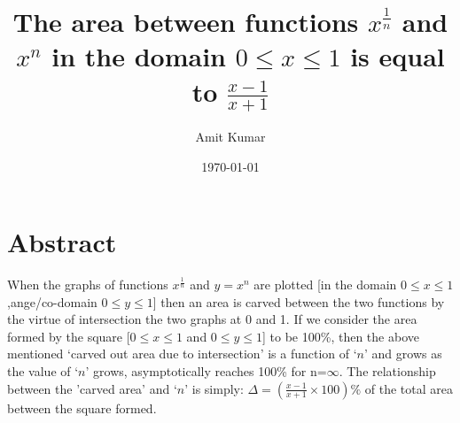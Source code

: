 \documentclass[10pt, twoside]{article}
\title{The area between functions $x^{\frac{1}{n}}$ and $x^n$ in the domain $0 \le x \le 1$ is equal to $\frac{x-1}{x+1}$}
\author{Amit Kumar}
\date{\today}
\begin{document}
\maketitle
\section{Abstract}
When the graphs of functions $x^{\frac{1}{n}}$ and $y=x^n$ are plotted [in the domain $0 \le x \le 1$,ange/co-domain $0 \le y \le 1$] then an area is carved between the two functions by the virtue of intersection the two graphs at 0 and 1. If we consider the area formed by the square [$0 \le x \le 1$ and $0 \le y \le 1$] to be 100\%, then the above mentioned `carved out area due to intersection' is a function of `$n$' and grows as the value of `$n$' grows, asymptotically reaches 100\% for n=$\infty$. The relationship between the 'carved area' and `$n$' is simply: $\Delta = (\frac{x-1}{x+1}\times{100})\%$ of the total area between the square formed.
\end{document}
